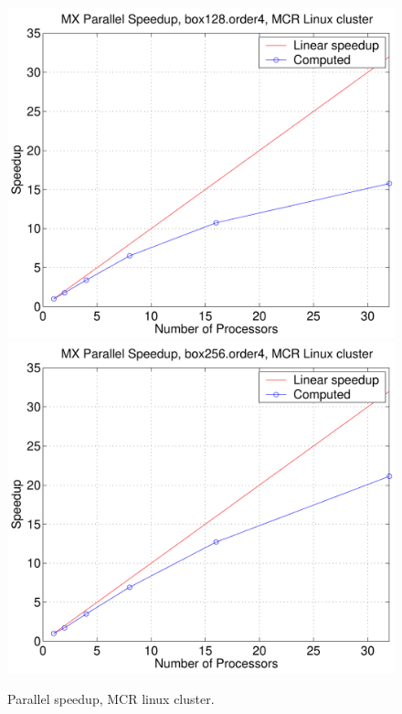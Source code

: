 \documentclass[11pt]{article}
\begin{document}
\begin{figure}
\begin{center}
  \includegraphics[width=\figWidth]{figures/speedupMCR-box128-order4}
  \includegraphics[width=\figWidth]{figures/speedupMCR-box256-order4}
\end{center}
\caption{Parallel speedup,  MCR linux cluster.}
\end{figure}
\end{document}
